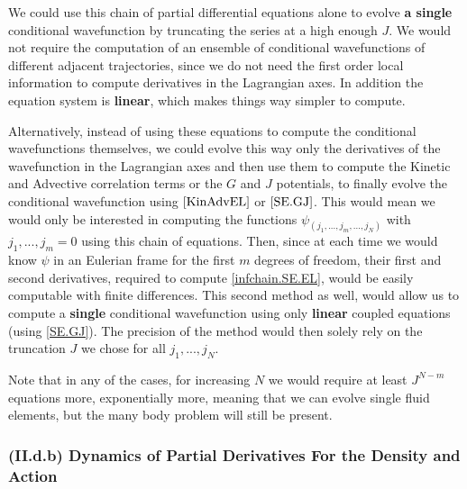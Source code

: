\documentclass[11pt, a4paper]{article} %
\begin{document}
We could use this chain of partial differential equations alone to evolve {\bf a single} conditional wavefunction by truncating the series at a high enough $J$. We would not require the computation of an ensemble of conditional wavefunctions of different adjacent trajectories, since we do not need the first order local information to compute derivatives in the Lagrangian axes. In addition the equation system is {\bf linear}, which makes things way simpler to compute.

Alternatively, instead of using these equations to compute the conditional wavefunctions themselves, we could evolve this way only the derivatives of the wavefunction in the Lagrangian axes and then use them to compute the Kinetic and Advective correlation terms or the $G$ and $J$ potentials, to finally evolve the conditional wavefunction using $\eqref{KinAdvEL}$ or $\eqref{SE.GJ}$. This would mean we would only be interested in computing the functions $\psi_{(j_1,...,j_m,...,j_N)}$ with $j_1,...,j_m=0$ using this chain of equations. Then, since at each time we would know $\psi$ in an Eulerian frame for the first $m$ degrees of freedom, their first and second derivatives, required to compute \eqref{infchain.SE.EL}, would be easily computable with finite differences. This second method as well, would allow us to compute a {\bf single} conditional wavefunction using only {\bf linear} coupled equations (using \eqref{SE.GJ}). The precision of the method would then solely rely on the truncation $J$ we chose for all $j_1,...,j_N$.

Note that in any of the cases, for increasing $N$ we would require at least $J^{N-m}$ equations more, exponentially more, meaning that we can evolve single fluid elements, but the many body problem will still be present.

\vspace{-0.1cm}

\subsubsection*{(II.d.b) Dynamics of Partial Derivatives For the Density and Action}\vspace{-0.1cm}
\end{document}
